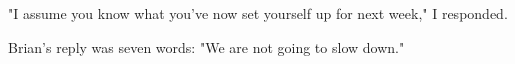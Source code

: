 "I assume you
                  know what you've now set yourself up for next week," I
                  responded.

Brian's reply was seven words: "We are
                  not going to slow down."


              
            
          
            
              
                


                  
              
            
          
